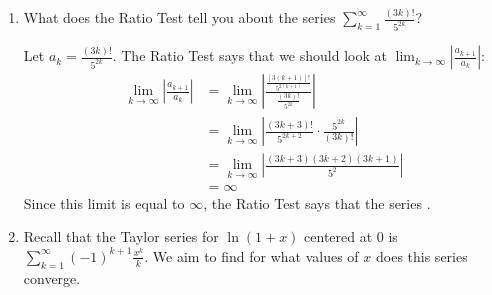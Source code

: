\documentclass[main]{subfiles}
\begin{document}
\begin{enumerate}
\begin{enumerate}
\begin{solution}
      Note that we still don't know if the Taylor series for $\sin(x)$ is actually \textit{equal} to $\sin(x)$. All we know is that the Taylor series for $\sin(x)$ converges to \textit{something} for all $x$ values.
\end{solution}
  \end{enumerate}

  \item 
  
  \begin{problem}[\vfill]
  What does the Ratio Test tell you about the series $\displaystyle
  \sum_{k=1}^\infty \frac{(3k)!}{5^{2k}}$?
  \end{problem}

  \begin{solution}
  Let $\displaystyle a_k = \frac{(3k)!}{5^{2k}}$.  The Ratio Test says
  that we should look at $\displaystyle \lim_{k \to \infty} \left|
  \frac{a_{k+1}}{a_k} \right|$:
  \begin{align*}
  \lim_{k \to \infty} \left| \frac{a_{k+1}}{a_k} \right| & = \lim_{k
  \to \infty} \left| \frac{\frac{[3(k + 1)]!}{5^{2 (k +
  1)}}}{\frac{(3k)!}{5^{2k}}} \right| \\
  & = \lim_{k \to \infty} \left|\frac{(3k + 3)!}{5^{2k + 2}}
  \cdot \frac{5^{2k}}{(3k)!} \right| \\
  & = \lim_{k \to \infty} \left| \frac{(3k + 3)(3k + 2)(3k +
  1)}{5^2} \right| \\
  & = \infty
  \end{align*}
  Since this limit is equal to $\infty$, the Ratio Test says that the
  series .
  \end{solution}

\pspace{\newpage}

 \item \label{ln-interval-of-convergence-v2}  
   
Recall that the Taylor series for $\ln(1+x)$ centered at 0 is $\displaystyle
\sum_{k=1}^\infty (-1)^{k+1} \frac{x^k}{k}$. We aim to find for what values of $x$ does this series converge.

  

\end{enumerate}
\end{document}
